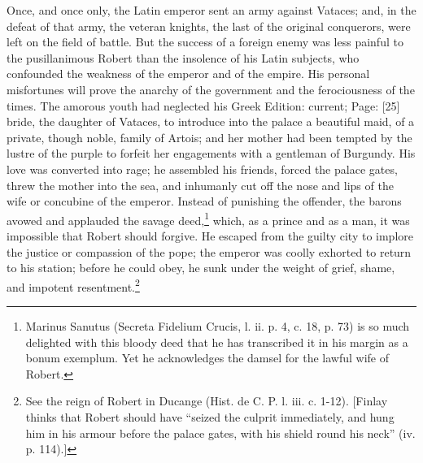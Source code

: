 Once, and once only, the Latin emperor sent an army against Vataces; and, in the defeat of that army, the veteran knights, the last of the original conquerors, were left on the field of battle. But the success of a foreign enemy was less painful to the pusillanimous Robert than the insolence of his Latin subjects, who confounded the weakness of the emperor and of the empire. His personal misfortunes will prove the anarchy of the government and the ferociousness of the times. The amorous youth had neglected his Greek Edition: current; Page: [25] bride, the daughter of Vataces, to introduce into the palace a beautiful maid, of a private, though noble, family of Artois; and her mother had been tempted by the lustre of the purple to forfeit her engagements with a gentleman of Burgundy. His love was converted into rage; he assembled his friends, forced the palace gates, threw the mother into the sea, and inhumanly cut off the nose and lips of the wife or concubine of the emperor. Instead of punishing the offender, the barons avowed and applauded the savage deed,\footnote{Marinus Sanutus (Secreta Fidelium Crucis, l. ii. p. 4, c. 18, p. 73) is so much delighted with this bloody deed that he has transcribed it in his margin as a bonum exemplum. Yet he acknowledges the damsel for the lawful wife of Robert.} which, as a prince and as a man, it was impossible that Robert should forgive. He escaped from the guilty city to implore the justice or compassion of the pope; the emperor was coolly exhorted to return to his station; before he could obey, he sunk under the weight of grief, shame, and impotent resentment.\footnote{See the reign of Robert in Ducange (Hist. de C. P. l. iii. c. 1-12). [Finlay thinks that Robert should have \texthebrew{“}seized the culprit immediately, and hung him in his armour before the palace gates, with his shield round his neck\texthebrew{}” (iv. p. 114).]}

